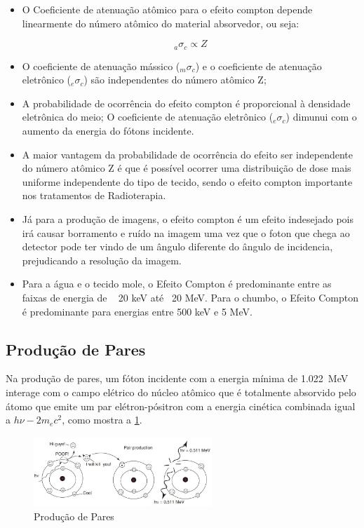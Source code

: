 \documentclass[11pt,a4paper]{article}
\begin{document}
    \begin{itemize}
		\item O Coeficiente de atenuação atômico para o efeito compton depende linearmente do número atômico do material absorvedor, ou seja:
		
			$${}_a\sigma_c \propto Z $$

		\item O coeficiente de atenuação mássico (${}_m\sigma_c$) e o coeficiente de atenuação eletrônico (${}_e\sigma_c$) são independentes do número atômico Z;
		
		\item A probabilidade de ocorrência do efeito compton é proporcional à densidade eletrônica do meio; O coeficiente de atenuação eletrônico (${}_e\sigma_c$) dimunui com o aumento da energia do fótons incidente.
		
		\item A maior vantagem da probabilidade de ocorrência do efeito ser independente do número atômico Z é que é possível ocorrer uma distribuição de dose mais uniforme independente do tipo de tecido, sendo o efeito compton importante nos tratamentos de Radioterapia.
		
		\item Já para a produção de imagens, o efeito compton é um efeito indesejado pois irá causar borramento e ruído na imagem uma vez que o foton que chega ao detector pode ter vindo de um ângulo diferente do ângulo de incidencia, prejudicando a resolução da imagem.
		
		\item Para a água e o tecido mole, o Efeito Compton é predominante entre as faixas de energia de ~ 20 keV até ~20 MeV. Para o chumbo, o Efeito Compton é predominante para energias entre 500 keV e 5 MeV.
	\end{itemize}
            
\subsection*{Produção de Pares}

                Na produção de pares, um fóton incidente com a energia mínima de \qty{1.022}{MeV} interage com o campo elétrico do núcleo atômico que é totalmente absorvido pelo átomo que emite um par elétron-pósitron com a energia cinética combinada igual a $h\nu - 2 m_ec^2$, como mostra a \ref{fig:esquemaProducaoDePares}.

                \begin{figure}[h]
                    \centering
                    \includegraphics[width=0.6\textwidth]{Imagens/producaoDePares.JPG}
                    \caption{Produção de Pares}
                    \label{fig:esquemaProducaoDePares}
                \end{figure}
\end{document}
